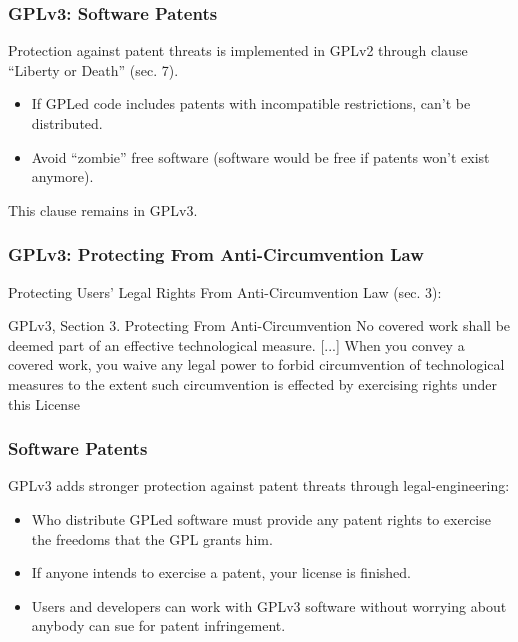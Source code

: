 \documentclass{beamer}
\begin{document}

\begin{frame}
\frametitle{GPLv3: Software Patents}
Protection against patent threats is implemented in GPLv2 through clause ``Liberty or Death'' (sec. 7).

\begin{itemize}
\item If GPLed code includes patents with incompatible restrictions, can't be distributed.
\item Avoid ``zombie'' free software (software would be free if patents won't exist anymore).
\end{itemize}

{\centerline{This clause remains in GPLv3.}}

\end{frame}


\begin{frame}
\frametitle{GPLv3: Protecting From Anti-Circumvention Law}
Protecting Users' Legal Rights From Anti-Circumvention Law (sec. 3):

\begin{block}{GPLv3, Section 3. Protecting From Anti-Circumvention}
No covered work shall be deemed part of an effective technological measure. [...] When you convey a covered work, you waive any legal power to forbid circumvention of technological measures to the extent such circumvention is effected by exercising rights
under this License 
 \end{block}


\end{frame}



\begin{frame}
\frametitle{Software Patents}
GPLv3 adds stronger protection against patent threats through legal-engineering:

\begin{itemize}
\item Who distribute GPLed software must provide any patent rights to exercise the freedoms that the GPL grants him.
\item If anyone intends to exercise a patent, your license is finished.
\item Users and developers can work with GPLv3 software without worrying about anybody can sue for patent infringement.
\end{itemize}


\end{frame}
\end{document}
